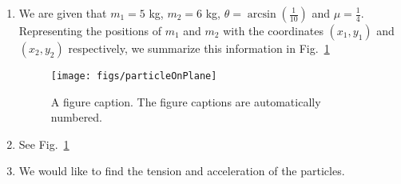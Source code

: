 %
%
%

\begin{enumerate}[label = \bfseries (\alph*)]

\item 

We are given that $m_1 = 5$ kg, $m_2 = 6$ kg, $\theta = \arcsin\left(\frac{1}{10}\right)$ and $\mu = \frac{1}{4}$. Representing the positions of $m_1$ and $m_2$ with the coordinates $(x_1,y_1)$ and $(x_2,y_2)$ respectively, we summarize this information in Fig.~\ref{2015:q5:fig:force1}

\begin{figure}
\begin{center}
\texttt{[image: figs/particleOnPlane]}
\caption{\label{2015:q5:fig:force1} A figure caption. The figure captions are
automatically numbered.}
\end{center}
\end{figure}


\item See Fig.~\ref{2015:q5:fig:force1}

\item We would like to find the tension and acceleration of the particles.



\end{enumerate}
